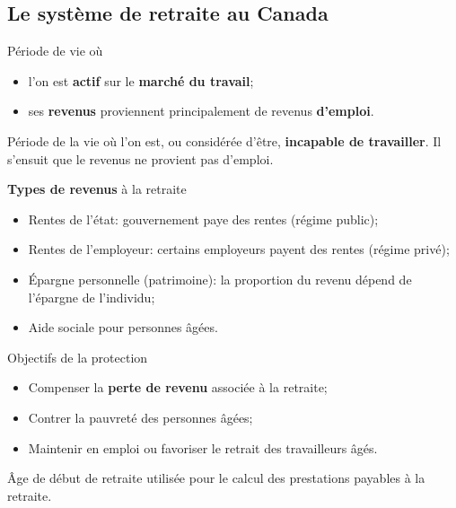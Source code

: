 \documentclass[10pt, french]{article}
\begin{document}
\begin{multicols*}{3}
\section{Le système de retraite au Canada}

\begin{definitionNOHFILL}
Période de vie où 
\begin{itemize}[leftmargin = *]
	\item	l'on est \textbf{actif} sur le \textbf{marché du travail};
	\item	ses \textbf{revenus} proviennent principalement de revenus \textbf{d'emploi}.
\end{itemize}
\end{definitionNOHFILL}

\begin{definitionNOHFILL}[La retraite]
Période de la vie où l'on est, ou considérée d'être, \textbf{incapable de travailler}. Il s'ensuit que le revenus ne provient pas d'emploi.

\begin{conceptgen}{\textbf{Types de revenus} à la retraite}
\begin{itemize}[leftmargin = *]
	\item	Rentes de l'état: gouvernement paye des rentes (régime public);
	\item	Rentes de l'employeur: certains employeurs payent des rentes (régime privé);
	\item	Épargne personnelle (patrimoine): la proportion du revenu dépend de l'épargne de l'individu;
	\item	Aide sociale pour personnes âgées.
\end{itemize}
\end{conceptgen} 

\begin{conceptgen}{Objectifs de la protection}
\begin{itemize}[leftmargin = *]
	\item	Compenser la \textbf{perte de revenu} associée à la retraite;
	\item	Contrer la pauvreté des personnes âgées;
	\item	Maintenir en emploi ou favoriser le retrait des travailleurs âgés.
\end{itemize}
\end{conceptgen} 
\end{definitionNOHFILL}


\begin{definitionNOHFILL}
Âge de début de retraite utilisée pour le calcul des prestations payables à la retraite.


\end{definitionNOHFILL}
\end{multicols*}
\end{document}
